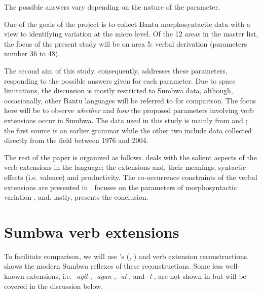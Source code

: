 \documentclass[output=paper		  ]{langscibook}
\begin{document}
{The possible answers vary depending on the nature of the parameter.}

{One of the goals of the project is to collect Bantu morphosyntactic data with a view to identifying variation at the micro level. Of the 12 areas in the master list, the focus of the present study will be on area 5: verbal derivation (parameters number 36 to 48).}

{The second aim of this study,  consequently, addresses these parameters, responding to the possible answers given for each parameter. Due to space limitations, the discussion is mostly restricted to Sumbwa data, although, occasionally, other Bantu languages will be referred to for comparison. The focus here will be to observe} {\textit{whether}} {and} {\textit{how}} {the proposed parameters involving verb extensions occur in Sumbwa. The data used in this study is mainly from \citet{Capus1898} and \citet{Kahigi2008a, Kahigi2008b}; the first source is an earlier grammar while the other two include data collected directly from the field between 1976 and 2004.}

{The rest of the paper is organized as follows.  deals with the salient aspects of the verb extensions in the language: the extensions and, their meanings,  syntactic effects (i.e. valence) and  productivity. The co-occurrence constraints of the verbal extensions are presented in .  focuses on the parameters of morphosyntactic variation \citep{GuéroisEtAl2017}, and, lastly,  presents the conclusion.} 

\section{Sumbwa verb extensions}\label{sec:kahigi:2}

{To facilitate comparison, we will use \citeauthor{Meeussen1967}'s (\citeyear[92]{Meeussen1967}, \citeyear{Meeussen1969}) and  verb extension reconstructions.  shows the modern Sumbwa reflexes of these} {reconstructions. Some less well-known extensions, i.e.} \mbox{\textit{{}-agil-}}, \mbox{\textit{{}-agan-}}, {\textit{{}-al-}}, and {\textit{{}-l-}}{, are not shown in  but will be covered in the discussion below.} 
\end{document}
